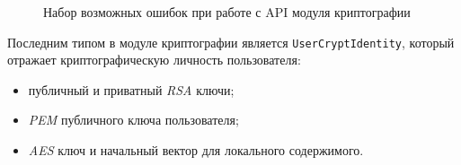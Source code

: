 \begin{figure}[h]
	
   \caption{Набор возможных ошибок при работе с API модуля криптографии}
   \label{sec:development:client:encryption:code:errors}
\end{figure}

Последним типом в модуле криптографии является \texttt{UserCryptIdentity}, который отражает криптографическую личность пользователя:
\begin{itemize}
	\item публичный и приватный \textit{RSA} ключи;
	\item \textit{PEM} публичного ключа пользователя;
	\item \textit{AES} ключ и начальный вектор для локального содержимого.
\end{itemize}